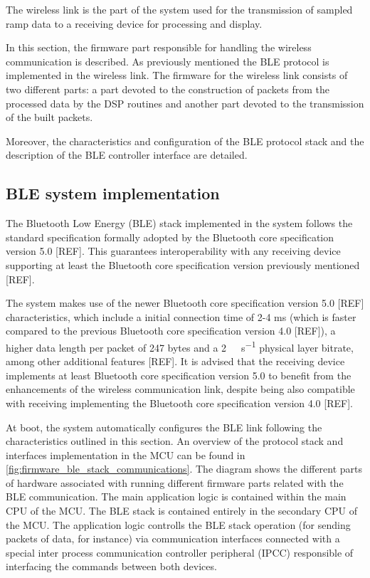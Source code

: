 The wireless link is the part of the system used for the transmission of sampled ramp data to a receiving device for processing and display.

In this section, the firmware part responsible for handling the wireless communication is described. As previously mentioned the BLE protocol is implemented in the wireless link. The firmware for the wireless link consists of two different parts: a part devoted to the construction of packets from the processed data by the DSP routines and another part devoted to the transmission of the built packets.

Moreover, the characteristics and configuration of the BLE protocol stack and the description of the BLE controller interface are detailed.

\subsection{BLE system implementation}


The Bluetooth Low Energy (BLE) stack implemented in the system follows the standard specification formally adopted by the Bluetooth core specification version 5.0 [REF]. This guarantees interoperability with any receiving device supporting at least the Bluetooth core specification version previously mentioned [REF].

The system makes use of the newer Bluetooth core specification version 5.0 [REF] characteristics, which include a initial connection time of 2-4 ms (which is faster compared to the previous Bluetooth core specification version 4.0 [REF]), a higher data length per packet of 247 bytes and a \SI{2}{\mega\bit\per\second} physical layer bitrate, among other additional features [REF]. It is advised that the receiving device implements at least Bluetooth core specification version 5.0 to benefit from the enhancements of the wireless communication link, despite being also compatible with receiving implementing the Bluetooth core specification version 4.0 [REF].

At boot, the system automatically configures the BLE link following the characteristics outlined in this section. An overview of the protocol stack and interfaces implementation in the MCU can be found in \cref{fig:firmware_ble_stack_communications}. The diagram shows the different parts of hardware associated with running different firmware parts related with the BLE communication. The main application logic is contained within the main CPU of the MCU. The BLE stack is contained entirely in the secondary CPU of the MCU. The application logic controlls the BLE stack operation (for sending packets of data, for instance) via communication interfaces connected with a special inter process communication controller peripheral (IPCC) responsible of interfacing the commands between both devices. %

